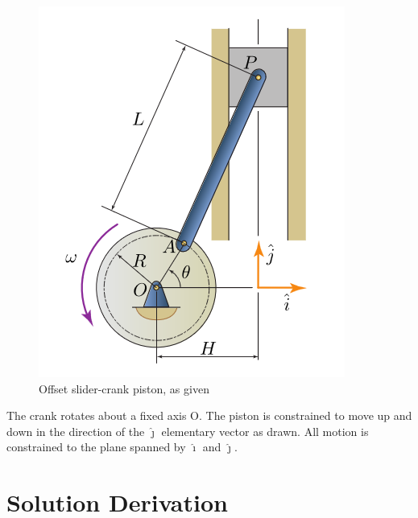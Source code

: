 \documentclass[nofoot,pdf-a,balance,colorlinks,upint,subscriptcorrection,varvw,mathalfa=cal=boondoxo]{asmeconf}
\begin{document}
    \begin{figure}[H]
        \centering
    	\includegraphics[scale=0.45]{problem_diagram.png}
    	\caption{Offset slider-crank piston, as given}\label{fig:diagram}
    \end{figure}

    \begin{table}[H]
        \caption[Table]{Case-Independent Known Values}\label{tab:given}
    \end{table}

    The crank rotates about a fixed axis O. The piston is constrained to move up and down in the direction of the $\hat{\jmath}$ elementary vector as drawn. All motion is constrained to the plane spanned by $\hat{\imath}$ and $\hat{\jmath}$.


    \section{Solution Derivation}
\end{document}
